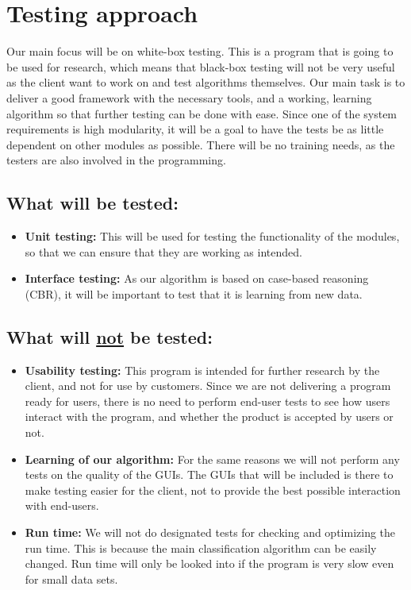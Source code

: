 \section{Testing approach}
Our main focus will be on white-box testing. This is a program that is going to be used for research, which means that black-box testing will not be very useful as the client want to work on and test algorithms themselves. Our main task is to deliver a good framework with the necessary tools, and a working, learning algorithm so that further testing can be done with ease. Since one of the system requirements is high modularity, it will be a goal to have the tests be as little dependent on other modules as possible. There will be no training needs, as the testers are also involved in the programming.

		\subsection*{What will be tested:}
			\begin{itemize}
				\renewcommand{\labelitemi}{$\bullet$}
					\item \textbf{Unit testing:} This will be used for testing the functionality of the modules, so that we can ensure that they are working as intended.
					\item \textbf{Interface testing:} As our algorithm is based on case-based reasoning (CBR), it will be important to test that it is learning from new data.
			\end{itemize}

		\subsection*{What will \underline{not} be tested:}
			\begin{itemize}
				\renewcommand{\labelitemi}{$\bullet$}
					\item \textbf{Usability testing:} This program is intended for further research by the client, and not for use by customers. Since we are not delivering a program ready for users, there is no need to perform end-user tests to see how users interact with the 							program, and whether the product is accepted by users or not.
					\item \textbf{Learning of our algorithm:} For the same reasons we will not perform any tests on the quality of the GUIs. The GUIs that will be included is there to make testing easier for the client, not to provide the best possible interaction with end-users.
					\item \textbf{Run time:} We will not do designated tests for checking and optimizing the run time. This is because the main classification algorithm can be easily changed. Run time will only be looked into if the program is very slow even for small data sets.
			\end{itemize}
		
